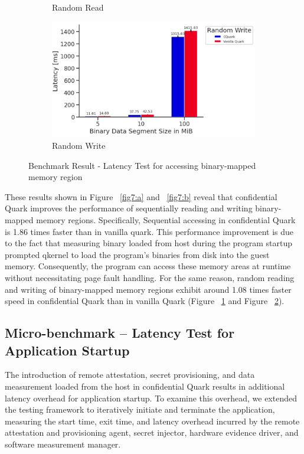 \begin{figure}[ht]
\begin{subfigure}[b]{0.5\linewidth}
      \caption{Random Read} 
      \label{fig7:c} 
    \end{subfigure}%
    \begin{subfigure}[b]{0.5\linewidth}
      \centering
      \includegraphics[width=0.9\linewidth]{images/Random_Write.PNG} 
      \caption{Random Write} 
      \label{fig7:d} 
    \end{subfigure} 
    \caption{Benchmark Result - Latency Test for accessing binary-mapped memory region}
    \label{fig7} 
\end{figure}



These results shown in Figure ~\ref{fig7:a} and ~\ref{fig7:b} reveal that confidential Quark improves the performance of sequentially reading and writing binary-mapped memory regions. Specifically, Sequential accessing in confidential Quark is 1.86 times faster than in vanilla quark. This performance 
improvement is due to the fact that measuring binary loaded from host during the program startup prompted qkernel to load the program's binaries from disk into the guest memory. Consequently, the program can access these memory areas at runtime without necessitating page fault handling. 
For the same reason, random reading and writing of binary-mapped memory regions exhibit around 1.08 times faster speed in confidential Quark than in vanilla Quark (Figure ~\ref{fig7:c} and Figure ~\ref{fig7:d}).



\subsection{Micro-benchmark – Latency Test for Application Startup}\label{micro_app_start_up}
The introduction of remote attestation, secret provisioning, and data measurement loaded from the host in confidential Quark results in additional latency overhead for application startup. To examine this overhead, we extended the testing framework to iteratively initiate and terminate the 
application, measuring the start time, exit time, and latency overhead incurred by the remote attestation and provisioning agent, secret injector, hardware evidence driver, and software measurement manager\cite*{benchamark_framework}.

